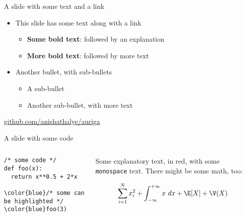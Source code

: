 \begin{frame}{A slide with some text and a link}

  \begin{itemize}
    \item This slide has some text along with a link
      \begin{itemize}
        \item \textbf{Some bold text}: followed by an explanation
        \item \textbf{More bold text}: followed by more text
      \end{itemize}
    \item Another bullet, with sub-bullets
      \begin{itemize}
        \item A sub-bullet
        \item Another sub-bullet, with more text
      \end{itemize}
  \end{itemize}

  \vspace{2ex}
  \begin{center}
    \color{blue} \href{https://github.com/anishathalye/auriga}{github.com/anishathalye/auriga}
  \end{center}

\end{frame}

\begin{frame}[fragile]{A slide with some code}

	\begin{columns}
		\begin{column}{0.5\linewidth}
			\footnotesize
			\begin{Verbatim}[commandchars=\\\{\}]
/* some code */
def foo(x):
  return x**0.5 + 2*x

\color{blue}/* some can be highlighted */
\color{blue}foo(3)
      \end{Verbatim}
    \end{column}
    \begin{column}{0.5\linewidth}
      {\color{red} Some explanatory text, in red, with some \texttt{monospace} text.}
      There might be some math, too:

      $$\sum_{i=1}^{N} x_i^2 + \int_{-\infty}^{+\infty}x~dx + \E[X] + \V(X)$$
    \end{column}
  \end{columns}

\end{frame}

